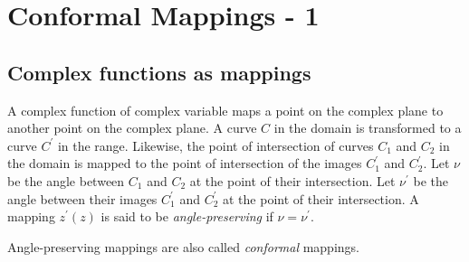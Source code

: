 \chapter{Conformal Mappings - 1}\label{c3}
\section{Complex functions as mappings}\label{c3s1}
A complex function of complex variable maps a point on the complex plane to 
another point on the complex plane. A curve $C$ in the domain is transformed
to a curve $C^\prime$ in the range. Likewise, the point of intersection of
curves $C_1$ and $C_2$ in the domain is mapped to the point of intersection of
the images $C_1^\prime$ and $C_2^\prime$. Let $\nu$ be the angle between $C_1$
and $C_2$ at the point of their intersection. Let $\nu^\prime$ be the angle
between their images $C_1^\prime$ and $C_2^\prime$ at the point of their 
intersection. A mapping $z^\prime(z)$ is said to be \emph{angle-preserving} if
$\nu = \nu^\prime$.

Angle-preserving mappings are also called \emph{conformal} mappings.


